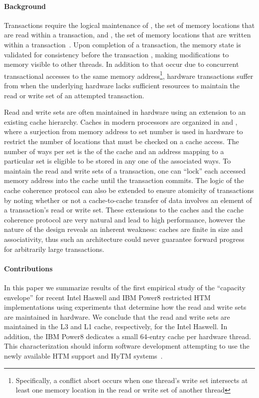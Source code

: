 \paragraph{Background}
Transactions require the logical 
maintenance of , the set
of memory locations that are read within a 
transaction, and , the set
of memory locations that are written within 
a transaction~\cite{HerlihyMo93}. Upon 
completion of a transaction, the memory state is validated for 
consistency before the transaction
, making modifications to memory 
visible to other threads.  In addition to 
that occur due to concurrent transactional accesses
to the same memory address\footnote{Specifically,
a conflict abort occurs when one thread's write set 
intersects at least one memory location in the 
read or write set of another thread}, hardware transactions suffer 
from  when the underlying hardware
lacks sufficient resources to maintain the
read or write set of an attempted transaction.

Read and write sets are often maintained in hardware 
using an extension to an existing cache hierarchy.
Caches in modern processors are organized in 
and , where a surjection from memory address to
set number is used in hardware to restrict the number of
locations that must be checked on a cache access.  The
number of ways per set is the  of the cache
and an address mapping to a particular set is eligible
to be stored in any one of the associated ways.  To
maintain the read and write sets of a transaction, one can
``lock'' each accessed memory address 
into the cache until the transaction
commits.  The logic of the cache coherence protocol
can also be extended to ensure atomicity of transactions
by noting whether or not a cache-to-cache transfer of 
data involves an element of a transaction's read or write
set.  These extensions to the caches and the cache coherence
protocol are very natural and lead to high performance, 
however the nature of the design reveals an inherent weakness:
caches are finite in size and associativity, thus such an
architecture could never guarantee forward progress for 
arbitrarily large transactions.



\paragraph{Contributions}
In this paper we summarize results of the first
empirical study of the ``capacity envelope'' for
recent Intel Haswell and IBM Power8 restricted HTM
implementations using experiments that determine how the
read and write sets are maintained in hardware. 
We conclude that the read and write sets are maintained
in the L3 and L1 cache, respectively, for the Intel Haswell.  
In addition, the IBM Power8 dedicates a small 64-entry 
cache per hardware thread.
This characterization should inform
software development attempting to use the newly available HTM support 
and HyTM systems~\cite{DamronFeLe06,MatveevSh13,MatveevSh15}.

